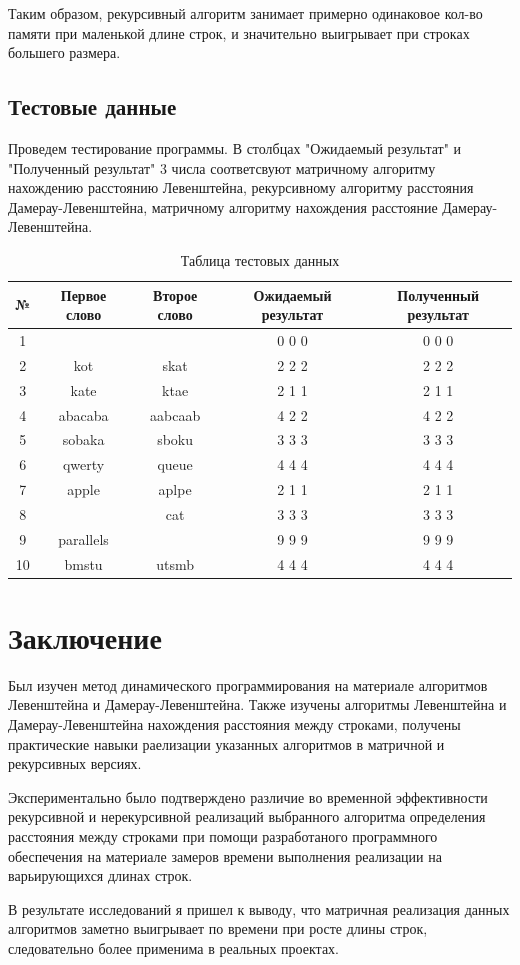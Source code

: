 \documentclass[12pt]{report}
\begin{document}
\par
Таким образом, рекурсивный алгоритм занимает примерно одинаковое кол-во памяти при маленькой длине строк, и значительно выигрывает при строках большего размера.


\section{Тестовые данные}

\par
Проведем тестирование программы. В столбцах "Ожидаемый результат" и "Полученный результат" 3 числа соответсвуют матричному алгоритму нахождению расстоянию Левенштейна, рекурсивному алгоритму расстояния Дамерау-Левенштейна, матричному алгоритму нахождения расстояние Дамерау-Левенштейна.

\begin{table} [h!]
\caption{Таблица тестовых данных}
	\begin{tabular}{|c c c c c|} 
 	\hline
	№ & Первое слово & Второе слово & Ожидаемый результат & Полученный результат \\ [0.8ex] 
 	\hline\hline
 	1 &  &  & 0 0 0 & 0 0 0\\
 	\hline
 	2 & kot & skat & 2 2 2 & 2 2 2\\
 	\hline
	3 & kate & ktae & 2 1 1 & 2 1 1\\
	\hline
	4 & abacaba & aabcaab & 4 2 2 & 4 2 2\\
	\hline
	5 & sobaka & sboku & 3 3 3 & 3 3 3\\
	\hline
	6 & qwerty & queue & 4 4 4 & 4 4 4\\
	\hline
	7 & apple & aplpe & 2 1 1  & 2 1 1\\
	\hline
	8 &  & cat & 3 3 3 & 3 3 3\\
	\hline
	9 & parallels &  & 9 9 9 & 9 9 9\\
	\hline
	10 & bmstu & utsmb & 4 4 4 & 4 4 4\\
	\hline
	\end{tabular}
\end{table}



\chapter*{Заключение}
Был изучен метод динамического программирования на материале алгоритмов Левенштейна и Дамерау-Левенштейна.
Также изучены алгоритмы Левенштейна и Дамерау-Левенштейна нахождения расстояния между строками, получены практические навыки раелизации указанных алгоритмов
в матричной  и рекурсивных версиях. 

Экспериментально было подтверждено различие во временной эффективности рекурсивной и нерекурсивной реализаций выбранного алгоритма определения расстояния между строками при помощи разработаного программного обеспечения на материале замеров времени выполнения реализации на варьирующихся длинах строк. 

В результате исследований я пришел к выводу, что матричная реализация данных алгоритмов заметно выигрывает по времени при росте длины строк, следовательно более применима в реальных проектах.
\end{document}
